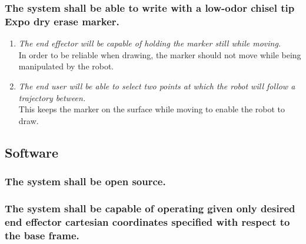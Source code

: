 \documentclass[12pt]{report}
\begin{document}
\subsubsection{The system shall be able to write with a low-odor chisel tip Expo dry erase marker.}
\begin{enumerate}[label=\thesubsubsection\alph*.,leftmargin=3cm,font=\itshape]
  \item \textit{The end effector will be capable of holding the marker still while moving.}\\
  In order to be reliable when drawing, the marker should not move while being manipulated by the robot.
  \item \textit{The end user will be able to select two points at which the robot will follow a trajectory between.} \\
  This keeps the marker on the surface while moving to enable the robot to draw.
\end{enumerate}

\subsection{Software}
\subsubsection{The system shall be open source.}
\subsubsection{The system shall be capable of operating given only desired end effector cartesian coordinates specified with respect to the base frame.}
\end{document}
